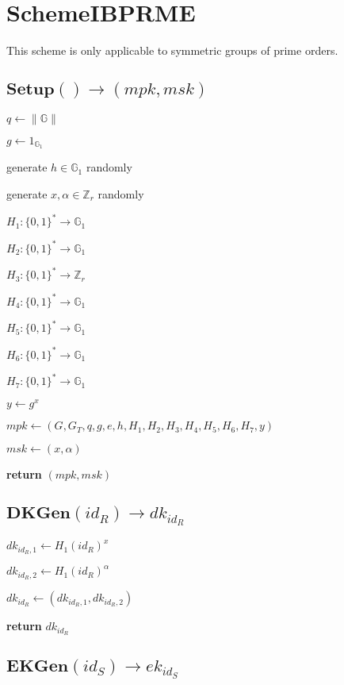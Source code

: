 \documentclass[a4paper]{article}
\begin{document}
\section{SchemeIBPRME}

This scheme is only applicable to symmetric groups of prime orders. 

\subsection{$\textbf{Setup}() \rightarrow (\textit{mpk}, \textit{msk})$}

$q \gets \|\mathbb{G}\|$

$g \gets 1_{\mathbb{G}_1}$

generate $h \in \mathbb{G}_1$ randomly

generate $x, \alpha \in \mathbb{Z}_r$ randomly

$H_1: \{0, 1\}^* \rightarrow \mathbb{G}_1$

$H_2: \{0, 1\}^* \rightarrow \mathbb{G}_1$

$H_3: \{0, 1\}^* \rightarrow \mathbb{Z}_r$

$H_4: \{0, 1\}^* \rightarrow \mathbb{G}_1$

$H_5: \{0, 1\}^* \rightarrow \mathbb{G}_1$

$H_6: \{0, 1\}^* \rightarrow \mathbb{G}_1$

$H_7: \{0, 1\}^* \rightarrow \mathbb{G}_1$

$y \gets g^x$

$ \textit{mpk} \gets (G, G_T, q, g, e, h, H_1, H_2, H_3, H_4, H_5, H_6, H_7, y)$

$\textit{msk} \gets (x, \alpha)$

\textbf{return} $(\textit{mpk}, \textit{msk})$

\subsection{$\textbf{DKGen}(\textit{id}_R) \rightarrow \textit{dk}_{\textit{id}_R}$}

$\textit{dk}_{\textit{id}_R, 1} \gets H_1(\textit{id}_R)^x$

$\textit{dk}_{\textit{id}_R, 2} \gets H_1(\textit{id}_R)^\alpha$

$\textit{dk}_{\textit{id}_R} \gets (\textit{dk}_{\textit{id}_R, 1}, \textit{dk}_{\textit{id}_R, 2})$

\textbf{return} $\textit{dk}_{\textit{id}_R}$

\subsection{$\textbf{EKGen}(\textit{id}_S) \rightarrow \textit{ek}_{\textit{id}_S}$}
\end{document}
